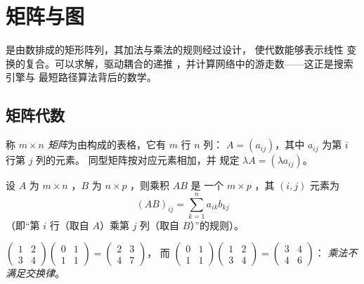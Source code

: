 \chapter{矩阵与图}\label{ch:g12:matrix}

是由数排成的矩形阵列，其加法与乘法的规则经过设计，
使代数能够表示线性
变换的复合。可以求解，驱动耦合的递推
，并计算网络中的游走数——这正是搜索引擎与
最短路径算法背后的数学。

\section{矩阵代数}

\begin{definition}[矩阵]\label{def:g12:matrix:matrix}
称 \emph{$m \times n$ 矩阵}为由构成的表格，它有
$m$ 行 $n$ 列：
$A = (a_{ij})$，其中 $a_{ij}$ 为第 $i$ 行第 $j$ 列的元素。
同型矩阵按对应元素相加，并
规定 $\lambda A = (\lambda a_{ij})$。
\end{definition}

\begin{definition}[矩阵乘积]\label{def:g12:matrix:product}
设 $A$ 为 $m \times n$ ，$B$ 为 $n \times p$ ，则乘积 $AB$ 是
一个 $m \times p$ ，其 $(i,j)$ 元素为
\[
(AB)_{ij} = \sum_{k=1}^{n} a_{ik} b_{kj}
\]
（即“第 $i$ 行（取自 $A$）乘第 $j$ 列（取自 $B$）”的规则）。
\end{definition}

\begin{example}
$\begin{pmatrix} 1 & 2\\ 3 & 4\end{pmatrix}
\begin{pmatrix} 0 & 1\\ 1 & 1\end{pmatrix}
= \begin{pmatrix} 2 & 3\\ 4 & 7\end{pmatrix}$，
\quad 而 \quad
$\begin{pmatrix} 0 & 1\\ 1 & 1\end{pmatrix}
\begin{pmatrix} 1 & 2\\ 3 & 4\end{pmatrix}
= \begin{pmatrix} 3 & 4\\ 4 & 6\end{pmatrix}$：
\emph{乘法不满足交换律}。
\end{example}

